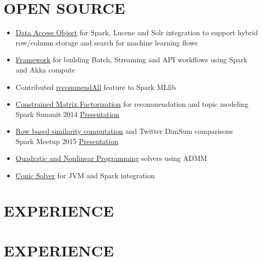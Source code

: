 \documentclass[margin]{res}
\begin{document}
\begin{resume}
\section{OPEN SOURCE}
\begin{itemize} \itemsep -2pt
\item \href{https://github.com/Verizon/trapezium/tree/master/dal} {Data Access Object} for
  Spark, Lucene and Solr integration to support hybrid row/column storage and
  search for machine learning flows

\item \href{https://github.com/Verizon/trapezium/tree/master/framework}
  {Framework} for building Batch, Streaming and API workflows using Spark and Akka compute

\item Contributed \href{https://issues.apache.org/jira/browse/SPARK-3066} {recommendAll} feature to Spark MLlib

\item \href {https://issues.apache.org/jira/browse/SPARK-2426} {Constrained
  Matrix Factorization} for recommendation and topic modeling\\
Spark Summit 2014 \href {http://debasish83.github.io/quadprog/SparkSummit072014.html} {Presentation}

\item \href{https://issues.apache.org/jira/browse/SPARK-4823} {Row based similarity computation} and Twitter DimSum comparisons\\
Spark Meetup 2015 \href{http://debasish83.github.io/spark-meetup-july2015/mf-slides.pdf} {Presentation}

\item \href{https://github.com/scalanlp/breeze/tree/master/math/src/main/scala/breeze/optimize}{Quadratic
and Nonlinear Programming} solvers using ADMM

\item \href{https://github.com/embotech/ecos-java-scala} {Conic Solver} for JVM and Spark integration
\end{itemize}

\section{EXPERIENCE}

\section{EXPERIENCE}


\end{resume}
\end{document}
